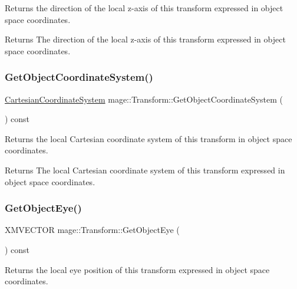 Returns the direction of the local z-\/axis of this transform expressed in object space coordinates.

\begin{DoxyReturn}{Returns}
The direction of the local z-\/axis of this transform expressed in object space coordinates. 
\end{DoxyReturn}
\hypertarget{structmage_1_1_transform_a6c14d929c23c6b6e065e7f9b0ed919ea}{}\label{structmage_1_1_transform_a6c14d929c23c6b6e065e7f9b0ed919ea} 
\subsubsection{\texorpdfstring{Get\+Object\+Coordinate\+System()}{GetObjectCoordinateSystem()}}
{\footnotesize\ttfamily \hyperlink{structmage_1_1_cartesian_coordinate_system}{Cartesian\+Coordinate\+System} mage\+::\+Transform\+::\+Get\+Object\+Coordinate\+System (\begin{DoxyParamCaption}{ }\end{DoxyParamCaption}) const}

Returns the local Cartesian coordinate system of this transform in object space coordinates.

\begin{DoxyReturn}{Returns}
The local Cartesian coordinate system of this transform expressed in object space coordinates. 
\end{DoxyReturn}
\hypertarget{structmage_1_1_transform_ac6808d885014b98c6920f8a770d3c7d4}{}\label{structmage_1_1_transform_ac6808d885014b98c6920f8a770d3c7d4} 
\subsubsection{\texorpdfstring{Get\+Object\+Eye()}{GetObjectEye()}}
{\footnotesize\ttfamily X\+M\+V\+E\+C\+T\+OR mage\+::\+Transform\+::\+Get\+Object\+Eye (\begin{DoxyParamCaption}{ }\end{DoxyParamCaption}) const}

Returns the local eye position of this transform expressed in object space coordinates.

